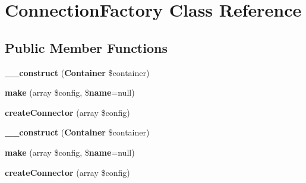 \section{Connection\+Factory Class Reference}
\label{class_illuminate_1_1_database_1_1_connectors_1_1_connection_factory}
\subsection*{Public Member Functions}
\begin{DoxyCompactItemize}
\item 
{\bf \+\_\+\+\_\+construct} ({\bf Container} \$container)
\item 
{\bf make} (array \$config, \${\bf name}=null)
\item 
{\bf create\+Connector} (array \$config)
\item 
{\bf \+\_\+\+\_\+construct} ({\bf Container} \$container)
\item 
{\bf make} (array \$config, \${\bf name}=null)
\item 
{\bf create\+Connector} (array \$config)
\end{DoxyCompactItemize}
